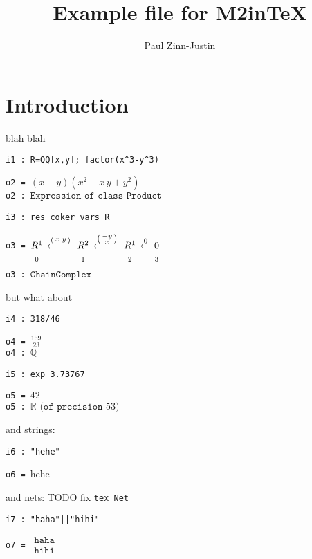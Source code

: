 \documentclass[12pt,a4paper]{amsart}
\title{Example file for M2inTeX}
\author{Paul Zinn-Justin}
\begin{document}
\maketitle

\section{Introduction}
blah blah
\smallskip
\begin{verbatim}
i1 : R=QQ[x,y]; factor(x^3-y^3)
\end{verbatim}
\verb|o2 = |$\left(x-y\right)\left(x^{  2}+x\,y+y^{  2}\right)$
\\
\verb|o2 : |$\texttt{Expression}\texttt{ of class }\texttt{Product}$
\begin{verbatim}
i3 : res coker vars R
\end{verbatim}
\verb|o3 = |$\underset{\vphantom{\Big|}0}{R^{  1}}\,\xleftarrow{\left(\begin{smallmatrix}
x&y\\
\end{smallmatrix}\right)}\,\underset{\vphantom{\Big|}1}{R^{  2}}\,\xleftarrow{\left(\begin{smallmatrix}
-y\\
x\\
\end{smallmatrix}\right)}\,\underset{\vphantom{\Big|}2}{R^{  1}}\,\xleftarrow{0}\,\underset{\vphantom{\Big|}3}{0}$
\\
\verb|o3 : |$\texttt{ChainComplex}$
\smallskip

but what about
\smallskip
\begin{verbatim}
i4 : 318/46
\end{verbatim}
\verb|o4 = |$\frac{159}{ 23}$
\\
\verb|o4 : |${\mathbb Q}$
\begin{verbatim}
i5 : exp 3.73767
\end{verbatim}
\verb|o5 = |${42}$
\\
\verb|o5 : |${\mathbb R}\texttt{ (of precision } 53\texttt{)}$
\smallskip

and strings:
\smallskip
\begin{verbatim}
i6 : "hehe"
\end{verbatim}
\verb|o6 = |hehe
\smallskip

and nets: TODO fix {\tt tex Net}
\smallskip
\begin{verbatim}
i7 : "haha"||"hihi"
\end{verbatim}
\verb|o7 = |$\begin{array}{l}\texttt{haha}\\
\texttt{hihi}\end{array}$
\smallskip
\end{document}
